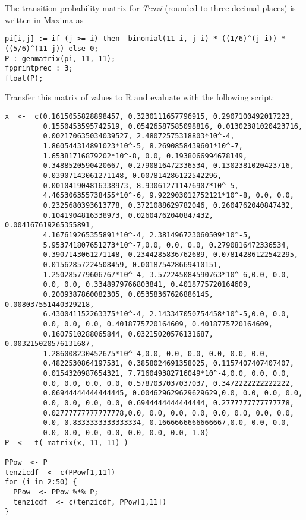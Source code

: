 \documentclass[12pt]{article}
\begin{document}
\begin{solution}
    The transition probability matrix for \emph{Tenzi} (rounded to three
    decimal places) is written in Maxima as
\begin{verbatim}
pi[i,j] := if (j >= i) then  binomial(11-i, j-i) * ((1/6)^(j-i)) *
((5/6)^(11-j)) else 0;
P : genmatrix(pi, 11, 11);
fpprintprec : 3;
float(P);
\end{verbatim}
    Transfer this matrix of values to R and evaluate with the following
    script:
\begin{verbatim}
x  <-  c(0.1615055828898457, 0.3230111657796915, 0.2907100492017223,
         0.1550453595742519, 0.05426587585098816, 0.01302381020423716,
         0.002170635034039527, 2.48072575318803*10^-4,
         1.860544314891023*10^-5, 8.2690858439601*10^-7,
         1.65381716879202*10^-8, 0.0, 0.1938066994678149,
         0.3488520590420667, 0.2790816472336534, 0.1302381020423716,
         0.03907143061271148, 0.007814286122542296,
         0.001041904816338973, 8.930612711476907*10^-5,
         4.465306355738455*10^-6, 9.922903012752121*10^-8, 0.0, 0.0,
         0.2325680393613778, 0.3721088629782046, 0.2604762040847432,
         0.1041904816338973, 0.02604762040847432, 0.004167619265355891,
         4.167619265355891*10^-4, 2.381496723060509*10^-5,
         5.953741807651273*10^-7,0.0, 0.0, 0.0, 0.2790816472336534,
         0.3907143061271148, 0.2344285836762689, 0.07814286122542295,
         0.01562857224508459, 0.001875428669410151,
         1.250285779606767*10^-4, 3.572245084590763*10^-6,0.0, 0.0,
         0.0, 0.0, 0.3348979766803841, 0.4018775720164609,
         0.2009387860082305, 0.05358367626886145, 0.008037551440329218,
         6.430041152263375*10^-4, 2.143347050754458*10^-5,0.0, 0.0,
         0.0, 0.0, 0.0, 0.4018775720164609, 0.4018775720164609,
         0.1607510288065844, 0.03215020576131687, 0.003215020576131687,
         1.286008230452675*10^-4,0.0, 0.0, 0.0, 0.0, 0.0, 0.0,
         0.4822530864197531, 0.3858024691358025, 0.1157407407407407,
         0.0154320987654321, 7.716049382716049*10^-4,0.0, 0.0, 0.0,
         0.0, 0.0, 0.0, 0.0, 0.5787037037037037, 0.3472222222222222,
         0.06944444444444445, 0.004629629629629629,0.0, 0.0, 0.0, 0.0,
         0.0, 0.0, 0.0, 0.0, 0.6944444444444444, 0.2777777777777778,
         0.02777777777777778,0.0, 0.0, 0.0, 0.0, 0.0, 0.0, 0.0, 0.0,
         0.0, 0.8333333333333334, 0.1666666666666667,0.0, 0.0, 0.0,
         0.0, 0.0, 0.0, 0.0, 0.0, 0.0, 0.0, 1.0)
P  <-  t( matrix(x, 11, 11) )

PPow  <- P
tenzicdf  <- c(PPow[1,11])
for (i in 2:50) {
  PPow  <- PPow %*% P;
  tenzicdf  <- c(tenzicdf, PPow[1,11])
}


\end{verbatim}
\end{solution}
\end{document}
